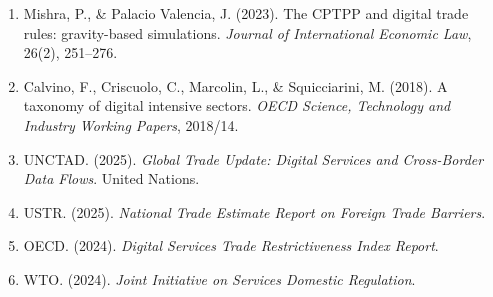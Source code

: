 \documentclass[11pt,a4paper]{article}
\begin{document}
\begin{enumerate}[leftmargin=2em]
\item[{[15]}] Mishra, P., \& Palacio Valencia, J. (2023). The CPTPP and digital trade rules: gravity-based simulations. \textit{Journal of International Economic Law}, 26(2), 251--276.
\item[{[16]}] Calvino, F., Criscuolo, C., Marcolin, L., \& Squicciarini, M. (2018). A taxonomy of digital intensive sectors. \textit{OECD Science, Technology and Industry Working Papers}, 2018/14.
\item[{[17]}] UNCTAD. (2025). \textit{Global Trade Update: Digital Services and Cross-Border Data Flows}. United Nations.
\item[{[18]}] USTR. (2025). \textit{National Trade Estimate Report on Foreign Trade Barriers}.
\item[{[19]}] OECD. (2024). \textit{Digital Services Trade Restrictiveness Index Report}.
\item[{[20]}] WTO. (2024). \textit{Joint Initiative on Services Domestic Regulation}.
\end{enumerate}
\end{document}
